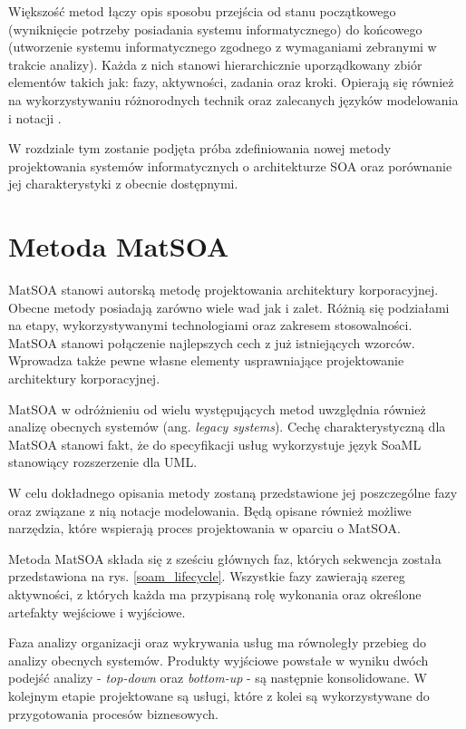 Większość metod łączy opis sposobu przejścia od stanu początkowego (wyniknięcie potrzeby posiadania systemu informatycznego) do końcowego (utworzenie systemu informatycznego zgodnego z wymaganiami zebranymi w trakcie analizy).  Każda z nich stanowi hierarchicznie uporządkowany zbiór elementów takich jak: fazy, aktywności, zadania oraz kroki. Opierają się również na wykorzystywaniu różnorodnych technik oraz zalecanych języków modelowania i notacji \cite{OffCompSOAM}.

W rozdziale tym zostanie podjęta próba zdefiniowania nowej metody projektowania systemów informatycznych o architekturze SOA oraz porównanie jej charakterystyki z obecnie dostępnymi.


\section{Metoda MatSOA}
MatSOA stanowi autorską metodę projektowania architektury korporacyjnej. Obecne metody posiadają zarówno wiele wad jak i zalet. Różnią się podziałami na etapy, wykorzystywanymi technologiami oraz zakresem stosowalności. MatSOA stanowi połączenie najlepszych cech z już istniejących wzorców. Wprowadza także pewne własne elementy usprawniające projektowanie architektury korporacyjnej. 

MatSOA w odróżnieniu od wielu występujących metod uwzględnia również analizę obecnych systemów (ang. \emph{legacy systems}). Cechę charakterystyczną dla MatSOA stanowi fakt, że do specyfikacji usług wykorzystuje język SoaML stanowiący rozszerzenie dla UML. 

W celu dokładnego opisania metody zostaną przedstawione jej poszczególne fazy oraz związane z nią notacje modelowania. Będą opisane również możliwe narzędzia, które wspierają proces projektowania w oparciu o MatSOA.

Metoda MatSOA składa się z sześciu głównych faz, których sekwencja została przedstawiona na rys. \ref{soam_lifecycle}. Wszystkie fazy zawierają szereg aktywności, z których każda ma przypisaną rolę wykonania oraz określone artefakty wejściowe i wyjściowe.

Faza analizy organizacji oraz wykrywania usług ma równoległy przebieg do analizy obecnych systemów. Produkty wyjściowe powstałe w wyniku dwóch podejść analizy - \emph{top-down} oraz \emph{bottom-up} - są następnie konsolidowane. W kolejnym etapie projektowane są usługi, które z kolei są wykorzystywane do przygotowania procesów biznesowych.


